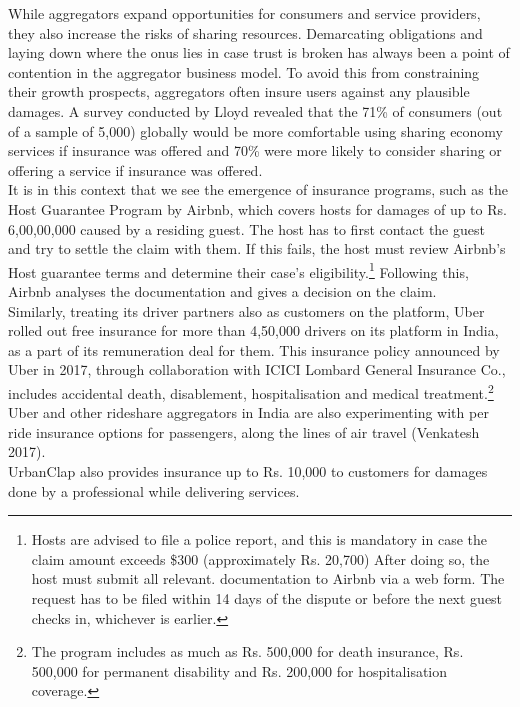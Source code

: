 \documentclass[a4paper, 12pt, twoside]{article}
\begin{document}
While aggregators expand opportunities for consumers and service providers, they also increase the risks of sharing resources. Demarcating obligations and laying down where the onus lies in case trust is broken has always been a point of contention in the aggregator business model. To avoid this from constraining their growth prospects, aggregators often insure users against any plausible damages. A survey conducted by Lloyd revealed that the 71\% of consumers (out of a sample of 5,000) globally would be more comfortable using sharing economy services if insurance was offered and 70\% were more likely to consider sharing or offering a service if insurance was offered. \\

It is in this context that we see the emergence of insurance programs, such as the Host Guarantee Program by Airbnb, which covers hosts for damages of up to Rs. 6,00,00,000 caused by a residing guest. The host has to first contact the guest and try to settle the claim with them. If this fails, the host must review Airbnb's Host guarantee terms and determine their case’s eligibility.\footnote {Hosts are advised to file a police report, and this is mandatory in case the claim amount exceeds \$300 (approximately Rs. 20,700) After doing so, the host must submit all relevant. documentation to Airbnb via a web form. The request has to be filed within 14 days of the dispute or before the next guest checks in, whichever is earlier.} Following this, Airbnb analyses the documentation and gives a decision on the claim. \\

Similarly, treating its driver partners also as customers on the platform, Uber rolled out free insurance for more than 4,50,000 drivers on its platform in India, as a part of its remuneration deal for them. This insurance policy announced by Uber in 2017, through collaboration with ICICI Lombard General Insurance Co., includes accidental death, disablement, hospitalisation and medical treatment.\footnote{The program includes as much as Rs. 500,000 for death insurance, Rs. 500,000 for permanent disability and Rs. 200,000 for hospitalisation coverage.}  Uber and other rideshare aggregators in India are also experimenting with per ride insurance options for passengers, along the lines of air travel (Venkatesh 2017). \\
                    
                    UrbanClap also provides insurance up to Rs. 10,000 to customers for damages done by a professional while delivering services. \\
\end{document}
